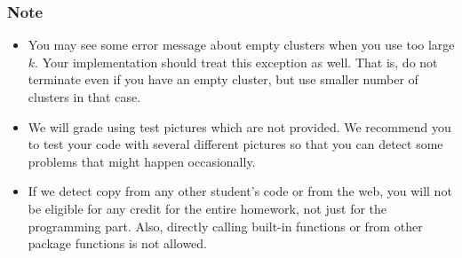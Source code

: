 \documentclass[twoside,10pt]{article}
\begin{document}
\subsubsection*{Note}
\begin{itemize}
  \item You may see some error message about empty clusters when you use too large $k$. Your implementation should treat this exception as well. That is, do not terminate even if you have an empty cluster, but use smaller number of clusters in that case.

  \item We will grade using test pictures which are not provided. We recommend you to test your code with several different pictures so that you can detect some problems that might happen occasionally. 

  \item If we detect copy from any other student's code or from the web, you will not be eligible for any credit for the entire homework, not just for the programming part. Also, directly calling built-in functions or from other package functions is not allowed.
\end{itemize}
\end{document}
